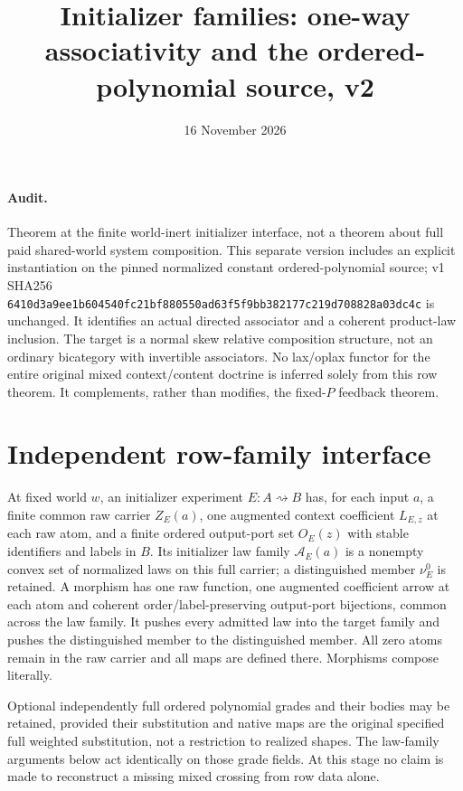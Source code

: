 \documentclass[11pt]{article}
\title{Initializer families: one-way associativity and the ordered-polynomial source, v2}
\date{16 November 2026}
\begin{document}
\maketitle
\paragraph{Audit.} Theorem at the finite world-inert initializer interface, not a theorem about full paid shared-world system composition. This separate version includes an explicit instantiation on the pinned normalized constant ordered-polynomial source; v1 SHA256 \texttt{6410d3a9ee1b604540fc21bf880550ad63f5f9bb382177c219d708828a03dc4c} is unchanged. It identifies an actual directed associator and a coherent product-law inclusion. The target is a normal skew relative composition structure, not an ordinary bicategory with invertible associators. No lax/oplax functor for the entire original mixed context/content doctrine is inferred solely from this row theorem. It complements, rather than modifies, the fixed-$P$ feedback theorem.

\section{Independent row-family interface}
At fixed world $w$, an initializer experiment $E:A\rightsquigarrow B$ has, for each input $a$, a finite common raw carrier $Z_E(a)$, one augmented context coefficient $L_{E,z}$ at each raw atom, and a finite ordered output-port set $O_E(z)$ with stable identifiers and labels in $B$. Its initializer law family $\mathcal A_E(a)$ is a nonempty convex set of normalized laws on this full carrier; a distinguished member $\nu_E^0$ is retained. A morphism has one raw function, one augmented coefficient arrow at each atom and coherent order/label-preserving output-port bijections, common across the law family. It pushes every admitted law into the target family and pushes the distinguished member to the distinguished member. All zero atoms remain in the raw carrier and all maps are defined there. Morphisms compose literally.

Optional independently full ordered polynomial grades and their bodies may be retained, provided their substitution and native maps are the original specified full weighted substitution, not a restriction to realized shapes. The law-family arguments below act identically on those grade fields. At this stage no claim is made to reconstruct a missing mixed crossing from row data alone.
\end{document}
